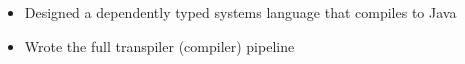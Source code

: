 \begin{itemize}
  \item Designed a dependently typed systems language that compiles to Java
  \item Wrote the full transpiler (compiler) pipeline
\end{itemize}
\vspace{4pt}
